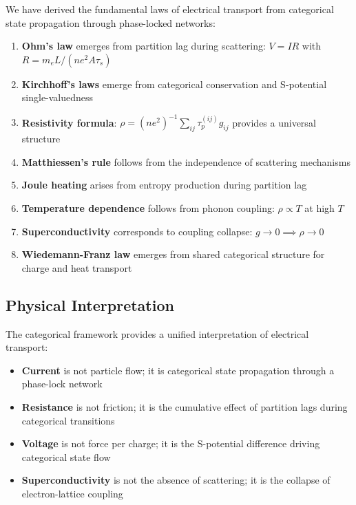 \documentclass[twocolumn,showpacs,preprintnumbers,amsmath,amssymb,prd]{revtex4-2}
\newcommand{\taup}{\tau_p}
\newcommand{\taus}{\tau_s}
\begin{document}
We have derived the fundamental laws of electrical transport from categorical state propagation through phase-locked networks:

\begin{enumerate}
\item \textbf{Ohm's law} emerges from partition lag during scattering: $V = IR$ with $R = m_eL/(ne^2A\taus)$

\item \textbf{Kirchhoff's laws} emerge from categorical conservation and S-potential single-valuedness

\item \textbf{Resistivity formula}: $\rho = (ne^2)^{-1}\sum_{ij}\taup^{(ij)}g_{ij}$ provides a universal structure

\item \textbf{Matthiessen's rule} follows from the independence of scattering mechanisms

\item \textbf{Joule heating} arises from entropy production during partition lag

\item \textbf{Temperature dependence} follows from phonon coupling: $\rho \propto T$ at high $T$

\item \textbf{Superconductivity} corresponds to coupling collapse: $g \to 0 \implies \rho \to 0$

\item \textbf{Wiedemann-Franz law} emerges from shared categorical structure for charge and heat transport
\end{enumerate}

\subsection{Physical Interpretation}

The categorical framework provides a unified interpretation of electrical transport:

\begin{itemize}
\item \textbf{Current} is not particle flow; it is categorical state propagation through a phase-lock network

\item \textbf{Resistance} is not friction; it is the cumulative effect of partition lags during categorical transitions

\item \textbf{Voltage} is not force per charge; it is the S-potential difference driving categorical state flow

\item \textbf{Superconductivity} is not the absence of scattering; it is the collapse of electron-lattice coupling
\end{itemize}
\end{document}
